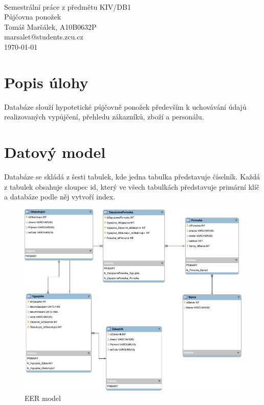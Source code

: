 \documentclass[titlepage]{article}
\begin{document}
\begin{titlepage}
\begin{center}
	\mbox{} \\[3cm]
	\Huge{Semestrální práce z předmětu KIV/DB1} \\[.5cm]
	\huge{Půjčovna ponožek} \\[2.5cm]
	\Large{Tomáš Maršálek, A10B0632P} \\
	\large{marsalet@students.zcu.cz} \\[1cm]
	\normalsize{\today}
\end{center}
\thispagestyle{empty}
\end{titlepage}

\section{Popis úlohy}
Databáze slouží hypotetické půjčovně ponožek především k uchovávání údajů realizovaných vypůjčení, přehledu zákazníků, zboží a personálu.

\section{Datový model}
Databáze se skládá z šesti tabulek, kde jedna tabulka představuje číselník.
Každá z tabulek obsahuje sloupec id, který ve všech tabulkách představuje
primární klíč a databáze podle něj vytvoří index.

\begin{figure}
\centering
	\includegraphics[width=\textwidth,angle=90]{eer.pdf}
	\caption{EER model}
\end{figure}
\end{document}
